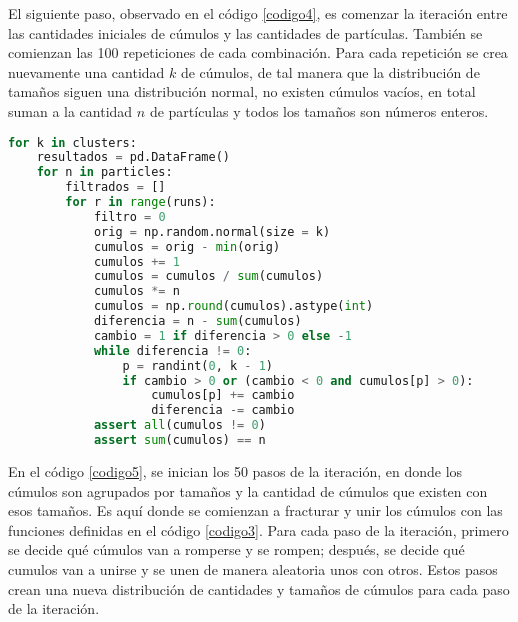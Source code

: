 \documentclass{article}
\begin{document}
El siguiente paso, observado en el c\'odigo \ref{codigo4}, es comenzar la iteraci\'on entre las cantidades iniciales de c\'umulos y las cantidades de part\'iculas. Tambi\'en se comienzan las 100 repeticiones de cada combinaci\'on. Para cada repetici\'on se crea nuevamente una cantidad $k$ de c\'umulos, de tal manera que la distribuci\'on de tama\~nos siguen una distribuci\'on normal, no existen c\'umulos vac\'ios, en total suman a la cantidad $n$ de part\'iculas y todos los tama\~nos son n\'umeros enteros.

\begin{lstlisting}[caption=Inicio de Iteraciones y Creaci\'on de C\'umulos, label=codigo4, language=Python]
for k in clusters:
    resultados = pd.DataFrame()
    for n in particles:
        filtrados = []
        for r in range(runs):
            filtro = 0
            orig = np.random.normal(size = k)
            cumulos = orig - min(orig)
            cumulos += 1
            cumulos = cumulos / sum(cumulos)
            cumulos *= n
            cumulos = np.round(cumulos).astype(int)
            diferencia = n - sum(cumulos)
            cambio = 1 if diferencia > 0 else -1
            while diferencia != 0:
                p = randint(0, k - 1)
                if cambio > 0 or (cambio < 0 and cumulos[p] > 0):
                    cumulos[p] += cambio
                    diferencia -= cambio
            assert all(cumulos != 0)
            assert sum(cumulos) == n
\end{lstlisting}

En el c\'odigo \ref{codigo5}, se inician los 50 pasos de la iteraci\'on, en donde los c\'umulos son agrupados por tama\~nos y la cantidad de c\'umulos que existen con esos tama\~nos. Es aqu\'i donde se comienzan a fracturar y unir los c\'umulos con las funciones definidas en el c\'odigo \ref{codigo3}. Para cada paso de la iteraci\'on, primero se decide qu\'e c\'umulos van a romperse y se rompen; despu\'es, se decide qu\'e cumulos van a unirse y se unen de manera aleatoria unos con otros. Estos pasos crean una nueva distribuci\'on de cantidades y tama\~nos de c\'umulos para cada paso de la iteraci\'on.

\newpage
\end{document}
